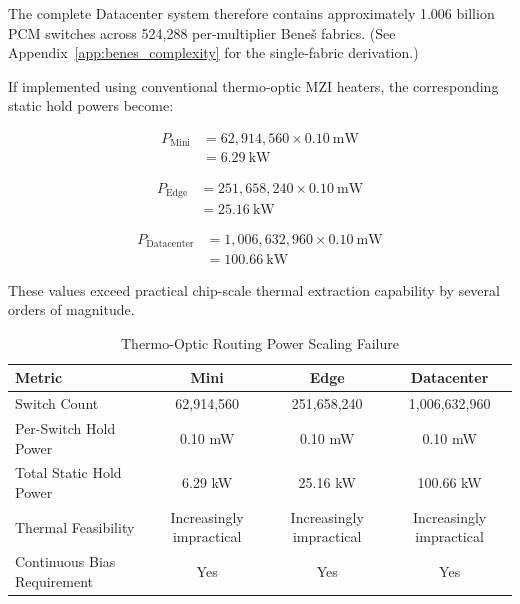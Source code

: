 \documentclass[journal]{IEEEtran}
\begin{document}
The complete Datacenter system therefore contains approximately 1.006 billion PCM switches across 524,288 per-multiplier Beneš fabrics. (See Appendix~\ref{app:benes_complexity} for the single-fabric derivation.) 

If implemented using conventional thermo-optic MZI heaters, the corresponding static hold powers become:

\begin{align}
P_{\mathrm{Mini}} &= 62{,}914{,}560 \times 0.10~\mathrm{mW} \\
&= 6.29~\mathrm{kW}
\end{align}

\begin{align}
P_{\mathrm{Edge}} &= 251{,}658{,}240 \times 0.10~\mathrm{mW} \\
&= 25.16~\mathrm{kW}
\end{align}

\begin{align}
P_{\mathrm{Datacenter}} &= 1{,}006{,}632{,}960 \times 0.10~\mathrm{mW} \\
&= 100.66~\mathrm{kW}
\end{align}

These values exceed practical chip-scale thermal extraction capability by several orders of magnitude.

\begin{table}[htbp]
\centering
\caption{
Thermo-Optic Routing Power Scaling Failure
}
\label{tab:mzi_failure}
\begin{tabular}{lccc}
\toprule

\textbf{Metric} & \textbf{Mini} & \textbf{Edge} & \textbf{Datacenter} \\
\midrule

Switch Count & 62{,}914{,}560 & 251{,}658{,}240 & 1{,}006{,}632{,}960 \\

Per-Switch Hold Power & 0.10 mW & 0.10 mW & 0.10 mW \\

Total Static Hold Power & 6.29 kW & 25.16 kW & 100.66 kW \\

Thermal Feasibility & Increasingly impractical & Increasingly impractical & Increasingly impractical \\

Continuous Bias Requirement & Yes & Yes & Yes \\

\bottomrule
\end{tabular}
\end{table}
\end{document}
